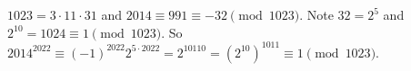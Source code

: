 $1023=3\cdot11\cdot31$ and $2014\equiv991\equiv-32\pmod{1023}$. Note $32=2^5$ and $2^{10}=1024\equiv1\pmod{1023}$. So $2014^{2022}\equiv(-1)^{2022}2^{5\cdot2022}=2^{10110}=\left(2^{10}\right)^{1011}\equiv\boxed{1}\pmod{1023}$.
